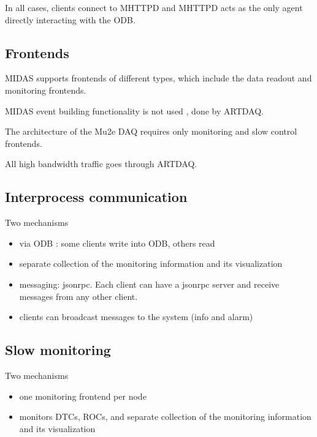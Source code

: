 In all cases, clients connect to MHTTPD and MHTTPD acts as
the only agent directly interacting with the ODB.


\subsection{Frontends}

MIDAS supports frontends of different types, which include the data readout and monitoring
frontends.

MIDAS event building functionality is not used , done by ARTDAQ.

The architecture of the Mu2e DAQ requires only monitoring and slow control frontends.

All high bandwidth traffic goes through ARTDAQ.

\subsection{Interprocess communication} 

Two mechanisms
\begin{itemize}
\item
  via ODB : some clients write into ODB, others read
\item
  separate collection of the monitoring information and its visualization
\item
  messaging: jsonrpc. Each client can have a jsonrpc server and receive messages
  from any other client.
\item
  clients can broadcast messages to the system (info and alarm)
\end{itemize}

\subsection{Slow monitoring} 

Two mechanisms
\begin{itemize}
\item
  one monitoring frontend per node 
\item
  monitors DTCs, ROCs, and separate collection of the monitoring information and its visualization
\end{itemize}


